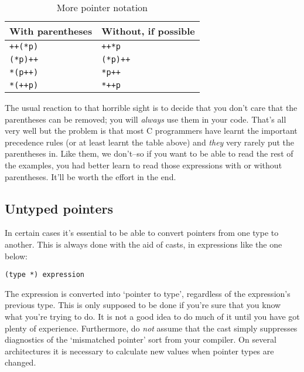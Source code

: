     \begin{table}[htb]
      \centering
      \begin{tabular}{ll}
        \toprule
        With parentheses & Without, if possible    \\
        \midrule
        \texttt{++(*p)} & \texttt{++*p}    \\
        \texttt{(*p)++} & \texttt{(*p)++}    \\
        \texttt{*(p++)} & \texttt{*p++}    \\
        \texttt{*(++p)} & \texttt{*++p}    \\
        \bottomrule
      \end{tabular}
      \caption{\label{tab:pointerNot2}More pointer notation}
    \end{table}


   The usual reaction to that horrible sight is to decide that you don't
    care that the parentheses can be removed; you will \textit{always} use
    them in your code. That's all very well but the problem is that most
    C programmers have learnt the important precedence rules (or at least
    learnt the table above) and \textit{they} very rarely put the
    parentheses in. Like them, we don't--so if you want to be able to
    read the rest of the examples, you had better learn to read those
    expressions with or without parentheses. It'll be worth the effort in
    the end.


  

  \subsection{Untyped pointers}
   

   In certain cases it's essential to be able to convert pointers from
    one type to another. This is always done with the aid of casts, in
    expressions like the one below:


   \begin{Verbatim}
(type *) expression
\end{Verbatim}

   The expression is converted into `pointer to
    type', regardless of the expression's previous type. This
    is only supposed to be done if you're sure that you know what you're
    trying to do. It is not a good idea to do much of it until you have got
    plenty of experience. Furthermore, do \textit{not} assume that the cast
    simply suppresses diagnostics of the `mismatched pointer' sort
    from your compiler. On several architectures it is necessary to
    calculate new values when pointer types are changed.


